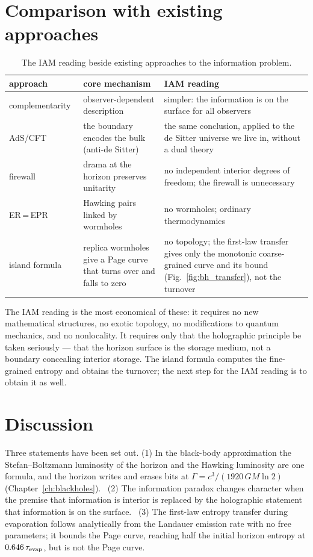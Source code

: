 \section{Comparison with existing approaches}\label{sec:bi_compare}
\begin{table}[htbp]\centering\small
\caption{The IAM reading beside existing approaches to the information problem. \interp}\label{tab:bi_compare}
\begin{tabularx}{\textwidth}{@{}>{\raggedright\arraybackslash}p{}>{\raggedright\arraybackslash}X>{\raggedright\arraybackslash}X@{}}\toprule
approach & core mechanism & IAM reading\\\midrule
complementarity~\cite{SusskindThorlaciusUglum1993} & observer-dependent description & simpler: the information is on the surface for all observers\\
AdS/CFT~\cite{Maldacena1998} & the boundary encodes the bulk (anti-de Sitter) & the same conclusion, applied to the de Sitter universe we live in, without a dual theory\\
firewall~\cite{AMPS2013} & drama at the horizon preserves unitarity & no independent interior degrees of freedom; the firewall is unnecessary\\
ER\,=\,EPR~\cite{MaldacenaSusskind2013} & Hawking pairs linked by wormholes & no wormholes; ordinary thermodynamics\\
island formula~\cite{Penington2020,Almheiri2020} & replica wormholes give a Page curve that turns over and falls to zero & no topology; the first-law transfer gives only the monotonic coarse-grained curve and its bound (Fig.~\ref{fig:bh_transfer}), not the turnover\\\bottomrule
\end{tabularx}
\end{table}
The IAM reading is the most economical of these: it requires no new mathematical structures, no exotic topology, no modifications to quantum mechanics, and
no nonlocality. It requires only that the holographic principle be taken seriously --- that the horizon surface is the storage medium, not a boundary
concealing interior storage. The island formula computes the fine-grained entropy and obtains the turnover; the next step for the IAM
reading is to obtain it as well. \interp

\section{Discussion}\label{sec:bi_discussion}
Three statements have been set out. (1) In the black-body approximation the Stefan--Boltzmann luminosity of the horizon and the Hawking luminosity are one
formula, and the horizon writes and erases bits at $\Gamma=c^3/(1920\,GM\ln2)$ (Chapter~\ref{ch:blackholes}). \derived\ (2) The information paradox changes character when the
premise that information is interior is replaced by the holographic statement that information is on the surface. \interp\ (3) The first-law entropy
transfer during evaporation follows analytically from the Landauer emission rate with no free parameters; it bounds the Page curve, reaching half the
initial horizon entropy at $0.646\,\tau_{\rm evap}$, but is not the Page curve. \derived

